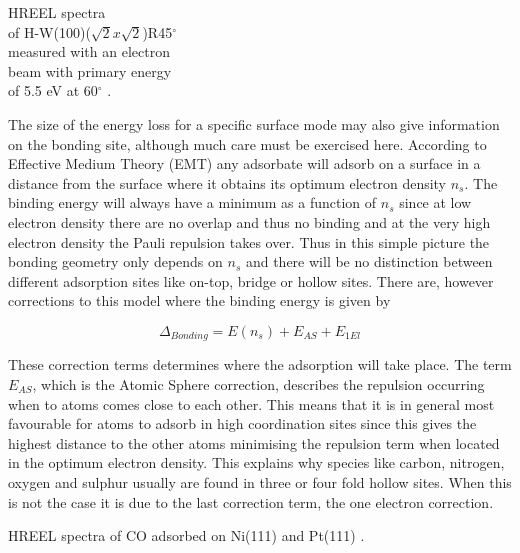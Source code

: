 \vspace*{14cm}

 HREEL spectra\\ of H-W(100)($\sqrt{2}x\sqrt{2}$)R45$^{\circ}$\\ measured with an electron\\ beam with primary energy\\ of 5.5 eV at 60$^{\circ}$ \cite{Barnes}.

\vspace{1cm} 

The size of the energy loss for a specific surface mode may also give information on the bonding site, although much care must be exercised here. According to Effective Medium Theory (EMT) any adsorbate will adsorb on a surface in a distance from the surface where it obtains its optimum electron density $n_s$. The binding energy will always have a minimum as a function of $n_s$ since at low electron density there are no overlap and thus no binding and at the very high electron density the Pauli repulsion takes over. Thus in this simple picture the bonding geometry only depends on $n_s$ and there will be no distinction between different adsorption sites like on-top, bridge or hollow sites. There are, however corrections to this model where the binding energy is  given by  

\begin{equation}
\Delta_{Bonding}=E(n_s)+E_{AS}+E_{1El}
\end{equation}

These correction terms determines where the adsorption will take place. The term $E_{AS}$, which is the Atomic Sphere correction, describes the repulsion occurring when to atoms comes close to each other. This means that it is in general most favourable for atoms to adsorb in high coordination sites since this gives the highest distance to the other atoms  minimising the repulsion term when located in the optimum electron density. This explains why species like carbon, nitrogen, oxygen and sulphur usually are found in three or four fold hollow sites. When this is not the case it is due to the last  correction term, the one electron correction. 

\vspace*{13cm}

 HREEL spectra of CO adsorbed on Ni(111) and Pt(111) \cite{Ibach}.

\vspace{1cm} 

